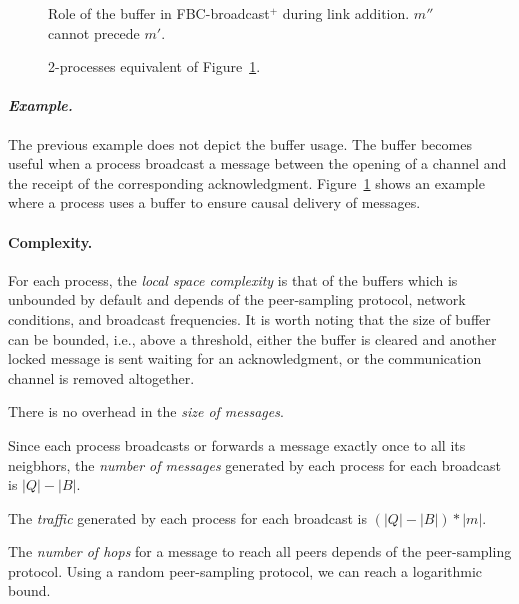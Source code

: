 \begin{figure}
  \begin{center}
    
    \caption{\label{fig:buffer}Role of the buffer in FBC-broadcast$^+$ during
      link addition. $m''$ cannot precede $m'$. }
  \end{center}
\end{figure}

\begin{figure}
  \begin{center}
    
    \caption{\label{fig:eq2buffer}2-processes equivalent of
      Figure~\ref{fig:buffer}.}
  \end{center}
\end{figure}

\paragraph{\emph{Example.}} The previous example does not depict the buffer
usage. The buffer becomes useful when a process broadcast a message between the
opening of a channel and the receipt of the corresponding
acknowledgment. Figure~\ref{fig:buffer} shows an example where a process uses a
buffer to ensure causal delivery of messages.  


\paragraph{Complexity.} For each process, the \emph{local space complexity} is
that of the buffers which is unbounded by default and depends of the
peer-sampling protocol, network conditions, and broadcast frequencies. It is
worth noting that the size of buffer can be bounded, i.e., above a threshold,
either the buffer is cleared and another locked message is sent waiting for an
acknowledgment, or the communication channel is removed altogether.

There is no overhead in the \emph{size of messages}. 

Since each process broadcasts or forwards a message exactly once to all its
neigbhors, the \emph{number of messages} generated by each process for each
broadcast is $|Q|-|B|$. 

The \emph{traffic} generated by each process for each broadcast is
$(|Q|-|B|)*|m|$. 

The \emph{number of hops} for a message to reach all peers depends of the
peer-sampling protocol. Using a random peer-sampling protocol, we can reach a
logarithmic bound.



